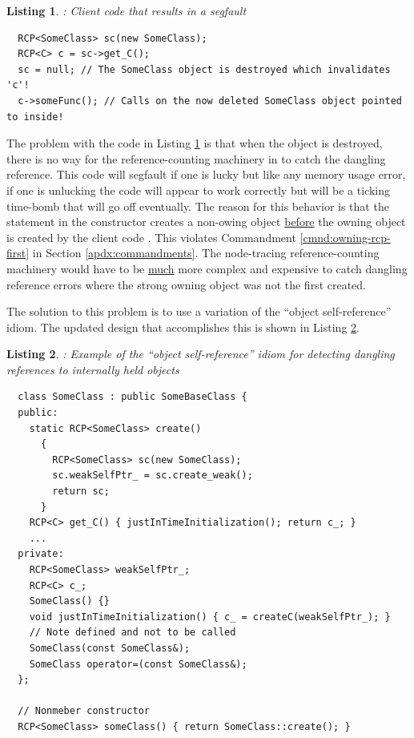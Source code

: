 \documentclass[pdf,ps2pdf,11pt]{SANDreport}
\newtheorem{listing}{Listing}
\begin{document}
\begin{listing}: Client code that results in a segfault  \\
\label{listing:osr:bad-use-SomeClass}
{\small\begin{verbatim}
  RCP<SomeClass> sc(new SomeClass);
  RCP<C> c = sc->get_C();
  sc = null; // The SomeClass object is destroyed which invalidates 'c'!
  c->someFunc(); // Calls on the now deleted SomeClass object pointed to inside!
\end{verbatim}}
\end{listing}


The problem with the code in Listing
{}\ref{listing:osr:bad-use-SomeClass} is that when the
{} object {} is destroyed, there is no way for
the reference-counting machinery in to catch the dangling reference.
This code will segfault if one is lucky but like any memory usage
error, if one is unlucking the code will appear to work correctly but
will be a ticking time-bomb that will go off eventually.  The reason
for this behavior is that the statement {} in the constructor {} creates a non-owing
{} object {}\underline{before} the owning {}
object is created by the client code {}.  This violates Commandment {}\ref{cmnd:owning-rcp-first}
in Section {}\ref{apdx:commandments}.  The node-tracing
reference-counting machinery would have to be {}\underline{much} more
complex and expensive to catch dangling reference errors where the
strong owning {} object was not the first created.

The solution to this problem is to use a variation of the ``object
self-reference'' idiom.  The updated design that accomplishes this is
shown in Listing {}\ref{listing:osr:SomeClass-refactored}.


\begin{listing}:  Example of the ``object self-reference'' idiom for
detecting dangling references to internally held objects  \\
\label{listing:osr:SomeClass-refactored}
{\small\begin{verbatim}
  class SomeClass : public SomeBaseClass {
  public:
    static RCP<SomeClass> create()
      {
        RCP<SomeClass> sc(new SomeClass);
        sc.weakSelfPtr_ = sc.create_weak();
        return sc;
      }
    RCP<C> get_C() { justInTimeInitialization(); return c_; }
    ...
  private:
    RCP<SomeClass> weakSelfPtr_;
    RCP<C> c_;
    SomeClass() {}
    void justInTimeInitialization() { c_ = createC(weakSelfPtr_); }
    // Note defined and not to be called
    SomeClass(const SomeClass&);
    SomeClass operator=(const SomeClass&);
  };

  // Nonmeber constructor
  RCP<SomeClass> someClass() { return SomeClass::create(); }
\end{verbatim}}
\end{listing}
\end{document}
